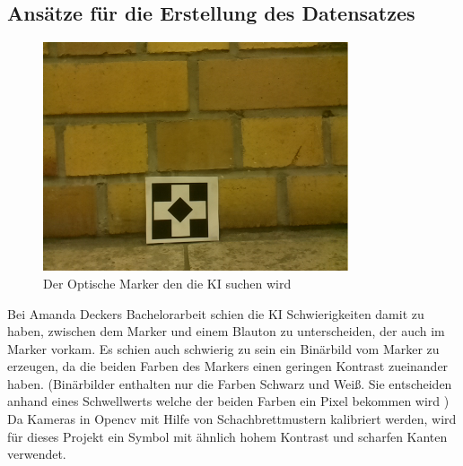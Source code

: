 \documentclass[conference]{IEEEtran}
\begin{document}
	\subsection{Ansätze für die Erstellung des Datensatzes}	%
	\begin{figure} [!h]
		\centering
		\includegraphics[width=9cm]{img/data1455211246.png}
		\caption{Der Optische Marker den die KI suchen wird }
		\label{Marker}
	\end{figure}
	
	Bei Amanda Deckers Bachelorarbeit \cite{Amanda} schien die KI 
	Schwierigkeiten damit zu haben, zwischen dem Marker und einem Blauton 
	zu unterscheiden, der auch im Marker vorkam.
	Es schien auch schwierig zu sein ein Binärbild vom Marker zu erzeugen, 
	da die beiden Farben des Markers einen geringen Kontrast zueinander 
	haben. (Binärbilder enthalten nur die Farben Schwarz und Weiß. Sie 
	entscheiden anhand eines Schwellwerts welche der beiden Farben ein 
	Pixel bekommen wird )
	Da Kameras in Opencv mit Hilfe von Schachbrettmustern kalibriert werden, wird für dieses Projekt ein Symbol mit ähnlich hohem Kontrast und scharfen Kanten verwendet.
	\\
	
\end{document}
